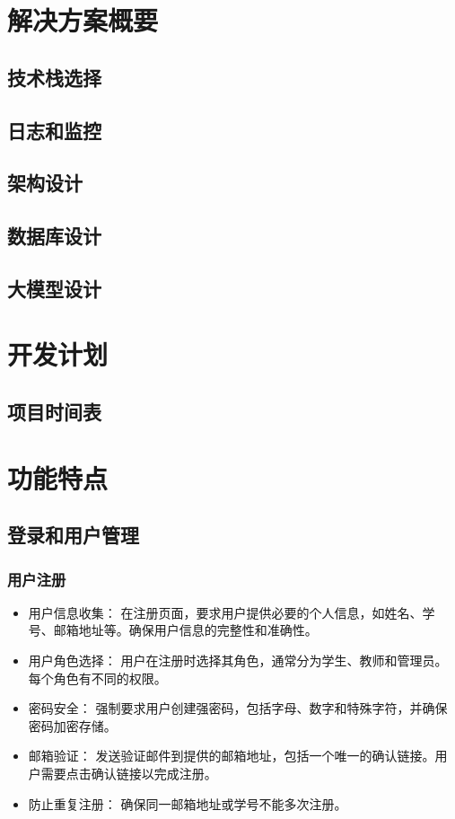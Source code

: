 \documentclass{article}
\begin{document}
\section{解决方案概要}
\subsection{技术栈选择}
\subsection{日志和监控}
\subsection{架构设计}
\subsection{数据库设计}
\subsection{大模型设计}
\section{开发计划}
\subsection{项目时间表}
\section{功能特点}
\subsection{登录和用户管理}
\subsubsection{用户注册}
\begin{itemize}
        \item 用户信息收集： 在注册页面，要求用户提供必要的个人信息，如姓名、学号、邮箱地址等。确保用户信息的完整性和准确性。
        \item 用户角色选择： 用户在注册时选择其角色，通常分为学生、教师和管理员。每个角色有不同的权限。
        \item 密码安全： 强制要求用户创建强密码，包括字母、数字和特殊字符，并确保密码加密存储。
        \item 邮箱验证： 发送验证邮件到提供的邮箱地址，包括一个唯一的确认链接。用户需要点击确认链接以完成注册。
        \item 防止重复注册： 确保同一邮箱地址或学号不能多次注册。   
\end{itemize}
\end{document}
